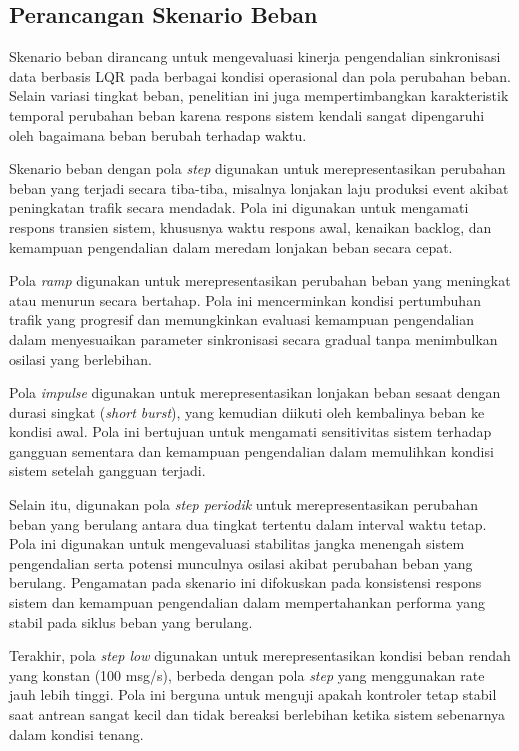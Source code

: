 \subsection{Perancangan Skenario Beban}

Skenario beban dirancang untuk mengevaluasi kinerja pengendalian sinkronisasi data berbasis LQR pada berbagai kondisi operasional dan pola perubahan beban.
Selain variasi tingkat beban, penelitian ini juga mempertimbangkan karakteristik temporal perubahan beban karena respons sistem kendali sangat dipengaruhi oleh bagaimana beban berubah terhadap waktu.

Skenario beban dengan pola \emph{step} digunakan untuk merepresentasikan perubahan beban yang terjadi secara tiba-tiba, misalnya lonjakan laju produksi event akibat peningkatan trafik secara mendadak.
Pola ini digunakan untuk mengamati respons transien sistem, khususnya waktu respons awal, kenaikan backlog, dan kemampuan pengendalian dalam meredam lonjakan beban secara cepat.

Pola \emph{ramp} digunakan untuk merepresentasikan perubahan beban yang meningkat atau menurun secara bertahap.
Pola ini mencerminkan kondisi pertumbuhan trafik yang progresif dan memungkinkan evaluasi kemampuan pengendalian dalam menyesuaikan parameter sinkronisasi secara gradual tanpa menimbulkan osilasi yang berlebihan.

Pola \emph{impulse} digunakan untuk merepresentasikan lonjakan beban sesaat dengan durasi singkat (\emph{short burst}), yang kemudian diikuti oleh kembalinya beban ke kondisi awal.
Pola ini bertujuan untuk mengamati sensitivitas sistem terhadap gangguan sementara dan kemampuan pengendalian dalam memulihkan kondisi sistem setelah gangguan terjadi.

Selain itu, digunakan pola \emph{step periodik} untuk merepresentasikan perubahan beban yang berulang antara dua tingkat tertentu dalam interval waktu tetap.
Pola ini digunakan untuk mengevaluasi stabilitas jangka menengah sistem pengendalian serta potensi munculnya osilasi akibat perubahan beban yang berulang.
Pengamatan pada skenario ini difokuskan pada konsistensi respons sistem dan kemampuan pengendalian dalam mempertahankan performa yang stabil pada siklus beban yang berulang.

Terakhir, pola \emph{step low} digunakan untuk merepresentasikan kondisi beban rendah yang konstan (100 msg/s), berbeda dengan pola \emph{step} yang menggunakan rate jauh lebih tinggi.
Pola ini berguna untuk menguji apakah kontroler tetap stabil saat antrean sangat kecil dan tidak bereaksi berlebihan ketika sistem sebenarnya dalam kondisi tenang.

